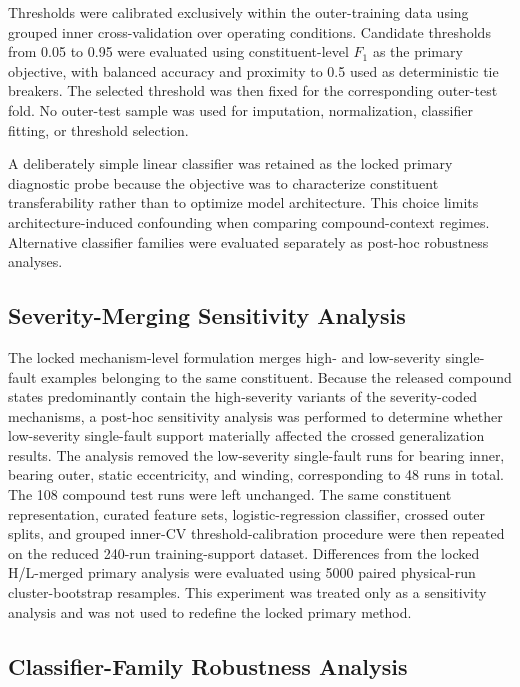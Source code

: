 Thresholds were calibrated exclusively within the outer-training data using
grouped inner cross-validation over operating conditions. Candidate
thresholds from 0.05 to 0.95 were evaluated using constituent-level $F_1$
as the primary objective, with balanced accuracy and proximity to 0.5 used
as deterministic tie breakers. The selected threshold was then fixed for
the corresponding outer-test fold. No outer-test sample was used for
imputation, normalization, classifier fitting, or threshold selection.

A deliberately simple linear classifier was retained as the locked primary
diagnostic probe because the objective was to characterize constituent
transferability rather than to optimize model architecture. This choice
limits architecture-induced confounding when comparing compound-context
regimes. Alternative classifier families were evaluated separately as
post-hoc robustness analyses.

\subsection{Severity-Merging Sensitivity Analysis}
\label{sec:severity}

The locked mechanism-level formulation merges high- and low-severity
single-fault examples belonging to the same constituent. Because the
released compound states predominantly contain the high-severity variants
of the severity-coded mechanisms, a post-hoc sensitivity analysis was
performed to determine whether low-severity single-fault support materially
affected the crossed generalization results. The analysis removed the
low-severity single-fault runs for bearing inner, bearing outer, static
eccentricity, and winding, corresponding to 48 runs in total. The 108
compound test runs were left unchanged. The same constituent
representation, curated feature sets, logistic-regression classifier,
crossed outer splits, and grouped inner-CV threshold-calibration procedure
were then repeated on the reduced 240-run training-support dataset.
Differences from the locked H/L-merged primary analysis were evaluated
using 5000 paired physical-run cluster-bootstrap resamples. This experiment
was treated only as a sensitivity analysis and was not used to redefine the
locked primary method.

\subsection{Classifier-Family Robustness Analysis}
\label{sec:classifierfamilies}

